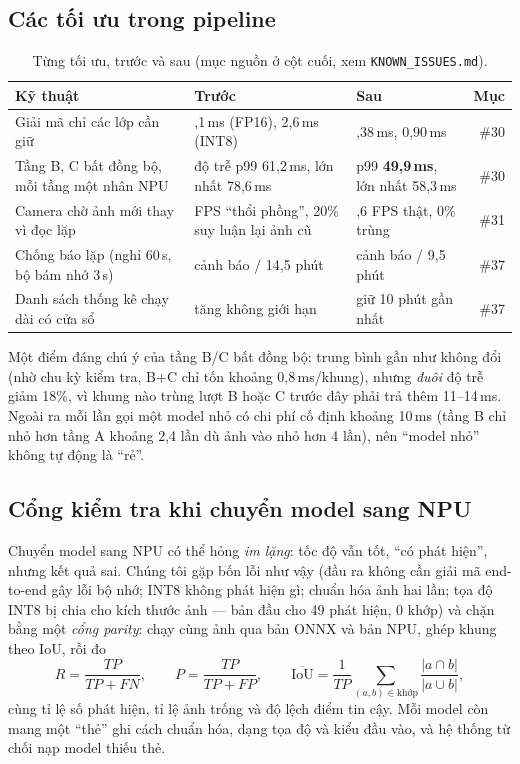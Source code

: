 \documentclass[12pt,a4paper]{article}
\newcommand{\file}[1]{\texttt{\small #1}}
\begin{document}
\subsection{Các tối ưu trong pipeline}

\begin{table}[ht]
\centering
\caption{Từng tối ưu, trước và sau (mục nguồn ở cột cuối, xem \file{KNOWN\_ISSUES.md}).}
\label{tab:opt}
\begin{tabularx}{\textwidth}{>{\raggedright\arraybackslash}X >{\raggedright\arraybackslash}X >{\raggedright\arraybackslash}X r}
\toprule
Kỹ thuật & Trước & Sau & Mục \\
\midrule
Giải mã chỉ các lớp cần giữ & 2,1\,ms (FP16), 2,6\,ms (INT8) & 0,38\,ms, 0,90\,ms & \#30 \\
Tầng B, C bất đồng bộ, mỗi tầng một nhân NPU & độ trễ p99 61,2\,ms, lớn nhất 78,6\,ms & p99 \textbf{49,9\,ms}, lớn nhất 58,3\,ms & \#30 \\
Camera chờ ảnh mới thay vì đọc lặp & 37 FPS ``thổi phồng'', 20\% suy luận lại ảnh cũ & 29,6 FPS thật, 0\% trùng & \#31 \\
Chống báo lặp (nghỉ 60\,s, bộ bám nhớ 3\,s) & 122 cảnh báo / 14,5 phút & 24 cảnh báo / 9,5 phút & \#37 \\
Danh sách thống kê chạy dài có cửa sổ & tăng không giới hạn & giữ 10 phút gần nhất & \#37 \\
\bottomrule
\end{tabularx}
\end{table}

Một điểm đáng chú ý của tầng B/C bất đồng bộ: trung bình gần như không đổi (nhờ chu kỳ kiểm tra, B+C chỉ tốn khoảng
0,8\,ms/khung), nhưng \emph{đuôi} độ trễ giảm 18\%, vì khung nào trùng lượt B hoặc C trước đây phải trả thêm 11--14\,ms.
Ngoài ra mỗi lần gọi một model nhỏ có chi phí cố định khoảng 10\,ms (tầng B chỉ nhỏ hơn tầng A khoảng 2,4 lần dù ảnh vào
nhỏ hơn 4 lần), nên ``model nhỏ'' không tự động là ``rẻ''.

\subsection{Cổng kiểm tra khi chuyển model sang NPU}

Chuyển model sang NPU có thể hỏng \emph{im lặng}: tốc độ vẫn tốt, ``có phát hiện'', nhưng kết quả sai. Chúng tôi gặp
bốn lỗi như vậy (đầu ra không cần giải mã end-to-end gây lỗi bộ nhớ; INT8 không phát hiện gì; chuẩn hóa ảnh hai lần;
tọa độ INT8 bị chia cho kích thước ảnh --- bản đầu cho 49 phát hiện, 0 khớp) và chặn bằng một \emph{cổng parity}:
chạy cùng ảnh qua bản ONNX và bản NPU, ghép khung theo IoU, rồi đo
\begin{equation}
  R=\frac{TP}{TP+FN},\qquad
  P=\frac{TP}{TP+FP},\qquad
  \overline{\mathrm{IoU}}=\frac{1}{TP}\sum_{(a,b)\in\text{khớp}}\frac{|a\cap b|}{|a\cup b|},
\end{equation}
cùng tỉ lệ số phát hiện, tỉ lệ ảnh trống và độ lệch điểm tin cậy. Mỗi model còn mang một ``thẻ'' ghi cách chuẩn hóa,
dạng tọa độ và kiểu đầu vào, và hệ thống từ chối nạp model thiếu thẻ.
\end{document}
